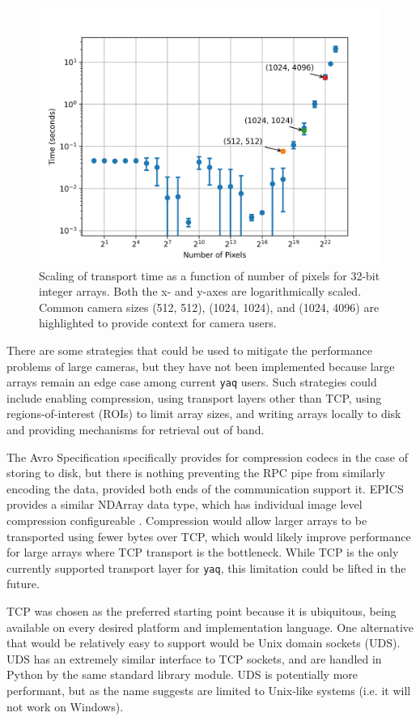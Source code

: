 \documentclass[11pt, full]{article}
\newcommand\yaq{\texttt{yaq}}
\begin{document}
\begin{figure}
  \includegraphics[width=.75\columnwidth]{figures/scaling/scaling}
	\caption{\label{si:fig:scaling} Scaling of transport time as a function of number of pixels for 32-bit integer arrays. Both the x- and y-axes are logarithmically scaled. Common camera sizes (512, 512), (1024, 1024), and (1024, 4096) are highlighted to provide context for camera users.}
\end{figure}


There are some strategies that could be used to mitigate the performance problems of large cameras, but they have not been implemented because large arrays remain an edge case among current \yaq{} users.
Such strategies could include enabling compression, using transport layers other than TCP, using regions-of-interest (ROIs) to limit array sizes, and writing arrays locally to disk and providing mechanisms for retrieval out of band.

The Avro Specification \cite{AvroSpecification} specifically provides for compression codecs in the case of storing to disk, but there is nothing preventing the RPC pipe from similarly encoding the data, provided both ends of the communication support it.
EPICS provides a similar NDArray data type, which has individual image level compression configureable \cite{normative_types}.
Compression would allow larger arrays to be transported using fewer bytes over TCP, which would likely improve performance for large arrays where TCP transport is the bottleneck.
While TCP is the only currently supported transport layer for \yaq{}, this limitation could be lifted in the future.

TCP was chosen as the preferred starting point because it is ubiquitous, being available on every desired platform and implementation language.
One alternative that would be relatively easy to support would be Unix domain sockets (UDS).
UDS has an extremely similar interface to TCP sockets, and are handled in Python by the same standard library module.
UDS is potentially more performant, but as the name suggests are limited to Unix-like systems (i.e. it will not work on Windows).
\end{document}
